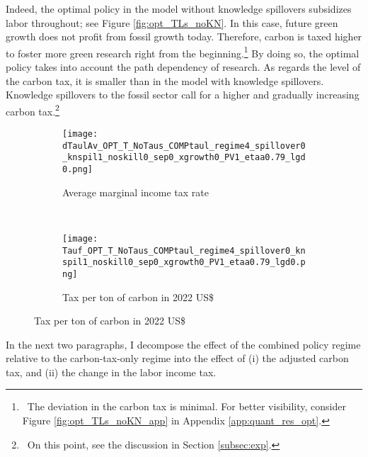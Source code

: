  Indeed, the optimal policy in the model without knowledge spillovers subsidizes labor throughout; see Figure \ref{fig:opt_TLs_noKN}. In this case, future green growth does not profit from fossil growth today. Therefore, carbon is taxed higher to foster more green research right from the beginning.\footnote{\ The deviation in the carbon tax is minimal. For better visibility, consider Figure \ref{fig:opt_TLs_noKN_app} in Appendix \ref{app:quant_res_opt}.} By doing so, the optimal policy takes into account the path dependency of research. As regards the level of the carbon tax, it is smaller than in the model with knowledge spillovers. Knowledge spillovers to the fossil sector call for a higher and gradually increasing carbon tax.\footnote{\ On this point, see the discussion in Section \ref{subsec:exp}.}

\begin{figure}[h!!!]
	\centering
	\caption{Optimal policy without knowledge spillovers}\label{fig:opt_TLs_noKN}
	\begin{subfigure}{0.4\textwidth}
		\caption{Average marginal income tax rate }
		\texttt{[image: dTaulAv\_OPT\_T\_NoTaus\_COMPtaul\_regime4\_spillover0\_knspil1\_noskill0\_sep0\_xgrowth0\_PV1\_etaa0.79\_lgd0.png]}
	\end{subfigure}
	\begin{minipage}[]{0.1\textwidth}
		\
	\end{minipage}
	\begin{subfigure}{0.4\textwidth}
		\caption{Tax per ton of carbon in 2022 US\$}
		\texttt{[image: Tauf\_OPT\_T\_NoTaus\_COMPtaul\_regime4\_spillover0\_knspil1\_noskill0\_sep0\_xgrowth0\_PV1\_etaa0.79\_lgd0.png]}
	\end{subfigure}
\end{figure} 


In the next two paragraphs, I decompose the effect of the combined policy regime relative to the carbon-tax-only regime into the effect of (i) the adjusted carbon tax, and (ii) the change in the labor income tax. %

